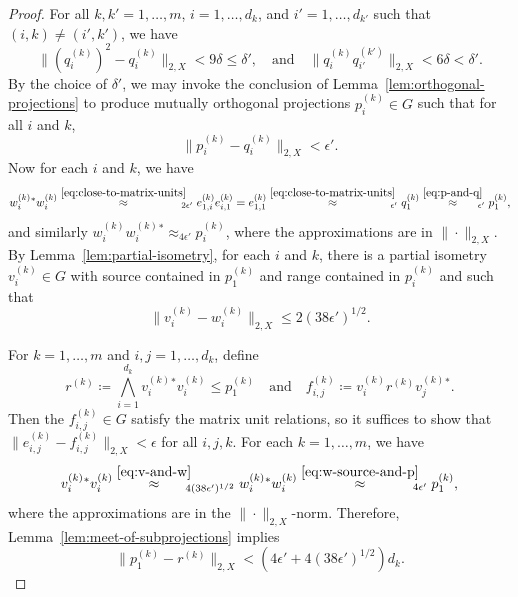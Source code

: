 \documentclass[a4paper,11pt]{amsart}
\theoremstyle{definition}
\numberwithin{equation}{section}
\numberwithin{theorem}{section}
\begin{document}
\begin{proof}
	For all  $k, k' = 1, \ldots, m$, $i = 1, \ldots, d_k$, and $i' = 1, \ldots, d_{k'}$ such that $(i,k)\neq (i',k')$, we have
 \begin{equation}
		\|(q_{i}^{(k)})^2 - q_{i}^{(k)} \|_{2, X} < 9\delta \leq \delta', \quad \text{and} \quad \|q_{i}^{(k)} q_{i'}^{(k')} \|_{2, X} < 6 \delta < \delta'.
	\end{equation}
	By the choice of $\delta'$, we may invoke the conclusion of Lemma~\ref{lem:orthogonal-projections} to produce mutually orthogonal projections $p_{i}^{(k)} \in G$ such that for all $i$ and $k$,
	\begin{equation}
		\label{eq:p-and-q}
		\| p_{i}^{(k)} - q_{i}^{(k)} \|_{2, X} < \epsilon'.
	\end{equation}
	Now for each $i$ and $k$, we have
	\begin{equation}
		\label{eq:w-source-and-p}
		w_{i}^{(k)}{}^*w_{i}^{(k)} \stackrel{\eqref{eq:close-to-matrix-units}}{\approx}_{\!\!\!2\epsilon'} e_{1, i}^{(k)} e_{i, 1}^{(k)} = e_{1, 1}^{(k)} \stackrel{\eqref{eq:close-to-matrix-units}}{\approx}_{\!\!\!\epsilon'} q_{1}^{(k)} \stackrel{\eqref{eq:p-and-q}}{\approx}_{\!\!\!\epsilon'} p_{1}^{(k)},
	\end{equation}
	and similarly $w_{i}^{(k)} w_{i}^{(k)}{}^* \approx_{4\epsilon'} p_{i}^{(k)}$, where the approximations are in $\|\cdot\|_{2, X}$.  By Lemma~\ref{lem:partial-isometry}, for each $i$ and $k$, there is a partial isometry $v_{i}^{(k)}\in G$ with source contained in $p_{1}^{(k)}$ and range contained in $p_{i}^{(k)}$ and such that
	\begin{equation}
		\label{eq:v-and-w}
		\| v_{i}^{(k)} - w_{i}^{(k)} \|_{2, X} \leq 2 (38\epsilon')^{1/2}.
	\end{equation}
	
	For $k = 1, \ldots, m$ and $i, j = 1, \ldots, d_k$, define
	\begin{equation}
		r^{(k)} \coloneqq \bigwedge_{i=1}^{d_k} v_{i}^{(k)}{}^* v_{i}^{(k)} \leq p_{1}^{(k)} \quad \text{and} \quad f_{i, j}^{(k)} \coloneqq v_{i}^{(k)} r^{(k)} v_{j}^{(k)}{}^*.
	\end{equation}
	Then the $f_{i, j}^{(k)}\in G$ satisfy the matrix unit relations, so it suffices to show that $\big\| e_{i, j}^{(k)} - f_{i, j}^{(k)} \big\|_{2, X} < \epsilon$ for all $i, j, k$.  For each $k = 1, \ldots, m$, we have
	\begin{equation}
		v_{i}^{(k)}{}^* v_{i}^{(k)} \stackrel{\eqref{eq:v-and-w}}{\approx}_{\!\!\!4(38\epsilon')^{1/2}} w_{i}^{(k)}{}^* w_{i}^{(k)} \stackrel{\eqref{eq:w-source-and-p}}{\approx}_{\!\!\!4\epsilon'} p_{1}^{(k)},
	\end{equation}
	where the approximations are in the $\|\cdot\|_{2, X}$-norm.  Therefore, Lemma~\ref{lem:meet-of-subprojections} implies 
	\begin{equation}\label{eq:p-and-r}
		\| p_{1}^{(k)} - r^{(k)} \|_{2, X} < (4\epsilon' + 4(38\epsilon')^{1/2}) d_k.
	\end{equation}
	

\end{proof}
\end{document}
